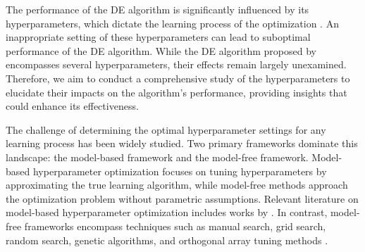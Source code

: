 \documentclass [PhD] {package/uclathes}
\begin{document}
The performance of the DE algorithm is significantly influenced by its hyperparameters, which dictate the learning process of the optimization \parencite{price2006differential}. An inappropriate setting of these hyperparameters can lead to suboptimal performance of the DE algorithm. While the DE algorithm proposed by \textcite{stokes2023metaheuristic} encompasses several hyperparameters, their effects remain largely unexamined. Therefore, we aim to conduct a comprehensive study of the hyperparameters to elucidate their impacts on the algorithm's performance, providing insights that could enhance its effectiveness.

The challenge of determining the optimal hyperparameter settings for any learning process has been widely studied. Two primary frameworks dominate this landscape: the model-based framework and the model-free framework. Model-based hyperparameter optimization focuses on tuning hyperparameters by approximating the true learning algorithm, while model-free methods approach the optimization problem without parametric assumptions. Relevant literature on model-based hyperparameter optimization includes works by \textcite{falkner2018bohb, hutter2011sequential, li2018hyperband, lujan2018design, mockus1978application, snoek2012practical, wu2020efficient, zoph2016neural}. In contrast, model-free frameworks encompass techniques such as manual search, grid search, random search, genetic algorithms, and orthogonal array tuning methods \parencite{liashchynskyi2019grid}.
\end{document}
